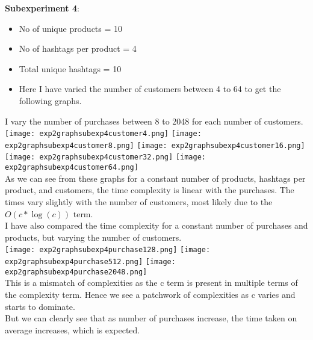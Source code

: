 \documentclass[12pt]{article}
\begin{document}
\textbf{Subexperiment 4}:\\
\begin{itemize}
    \item No of unique products = 10
    \item No of hashtags per product = 4
    \item Total unique hashtags = 10
    \item Here I have varied the number of customers between 4 to 64 to get the following graphs.
\end{itemize}
I vary the number of purchases between 8 to 2048 for each number of customers.\\
\texttt{[image: exp2graphsubexp4customer4.png]}
\texttt{[image: exp2graphsubexp4customer8.png]}
\texttt{[image: exp2graphsubexp4customer16.png]}
\texttt{[image: exp2graphsubexp4customer32.png]}
\texttt{[image: exp2graphsubexp4customer64.png]}\\
As we can see from these graphs for a constant number of products, hashtags per product, and customers, the time complexity is linear with the purchases. The times vary slightly with the number of customers, most likely due to the $O(c*\log(c))$ term.\\
I have also compared the time complexity for a constant number of purchases and products, but varying the number of customers.\\
\texttt{[image: exp2graphsubexp4purchase128.png]}
\texttt{[image: exp2graphsubexp4purchase512.png]}
\texttt{[image: exp2graphsubexp4purchase2048.png]}\\
This is a mismatch of complexities as the c term is present in multiple terms of the complexity term. Hence we see a patchwork of complexities as c varies and starts to dominate.\\
But we can clearly see that as number of purchases increase, the time taken on average increases, which is expected.\\
\end{document}
